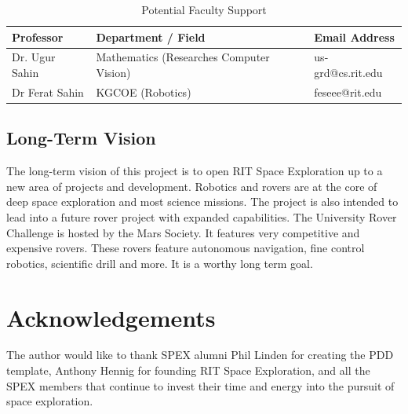 \documentclass[conference]{IEEEtran} %
\begin{document}
\begin{table}[ht!]
    \caption{Potential Faculty Support}
    \centering
    {\renewcommand{\arraystretch}{1.5}
    \begin{tabularx}{\linewidth}{LLL} 
    \hline
    \textbf{Professor} & \textbf{Department / Field} & \textbf{Email Address} \\
    \hline
    Dr. Ugur Sahin & Mathematics (Researches Computer Vision) & us-grd@cs.rit.edu \\
    Dr Ferat Sahin & KGCOE (Robotics) & feseee@rit.edu \\
    \hline
    \end{tabularx}
    }
\label{tab:fac-sup}
\end{table}

\subsection{Long-Term Vision}
\label{sec:vision}
The long-term vision of this project is to open RIT Space Exploration up to a new area of projects and development. 
Robotics and rovers are at the core of deep space exploration and most science missions. 
The project is also intended to lead into a future rover project with expanded capabilities.
The University Rover Challenge is hosted by the Mars Society. 
It features very competitive and expensive rovers. 
These rovers feature autonomous navigation, fine control robotics, scientific drill and more. 
It is a worthy long term goal. 


\section*{Acknowledgements}
The author would like to thank SPEX alumni Phil Linden for creating the PDD template, Anthony Hennig for founding RIT Space Exploration, and all the SPEX members that continue to invest their time and energy into the pursuit of space exploration.

\onecolumn
\appendices{}
\end{document}
